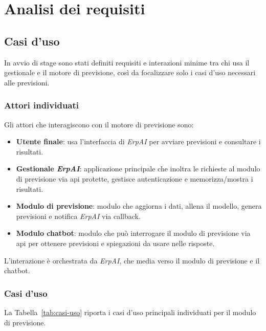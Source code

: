 \chapter{Analisi dei requisiti}
\label{chap:analisi-requisiti}

\section{Casi d'uso}
In avvio di stage sono stati definiti requisiti e interazioni minime tra chi usa il gestionale e il motore di previsione, così da focalizzare solo i casi d’uso necessari alle previsioni.

\subsection{Attori individuati}
Gli attori che interagiscono con il motore di previsione sono:
\begin{itemize}
    \item \textbf{Utente finale}: usa l’interfaccia di \textit{ErpAI} per avviare previsioni e consultare i risultati.
    \item \textbf{Gestionale \textit{ErpAI}}: applicazione principale che inoltra le richieste al modulo di previsione via \gls{api} protette, gestisce autenticazione e memorizza/mostra i risultati.
    \item \textbf{Modulo di previsione}: modulo che aggiorna i dati, allena il modello, genera previsioni e notifica \textit{ErpAI} via \gls{callback}.
    \item \textbf{Modulo chatbot}: modulo che può interrogare il modulo di previsione via \gls{api} per ottenere previsioni e spiegazioni da usare nelle risposte.
\end{itemize}
L’interazione è orchestrata da \textit{ErpAI}, che media verso il modulo di previsione e il chatbot.

\subsection{Casi d'uso}
La Tabella~\ref{tab:casi-uso} riporta i casi d’uso principali individuati per il modulo di previsione.
\vspace{0.5cm}
\tablelasttail{\hline}

